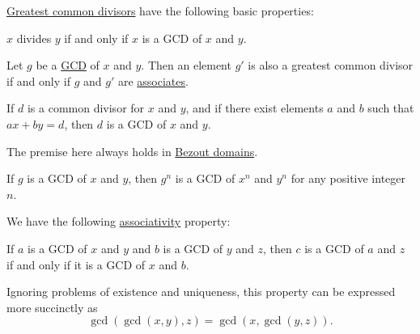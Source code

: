 \begin{proposition}\label{thm:def:gcd}
  \hyperref[def:gcd]{Greatest common divisors} have the following basic properties:
  \begin{thmenum}
     \( x \) divides \( y \) if and only if \( x \) is a GCD of \( x \) and \( y \).

     Let \( g \) be a \hyperref[def:gcd]{GCD} of \( x \) and \( y \). Then an element \( g' \) is also a greatest common divisor if and only if \( g \) and \( g' \) are \hyperref[def:domain_divisibility/associates]{associates}.

     If \( d \) is a common divisor for \( x \) and \( y \), and if there exist elements \( a \) and \( b \) such that \( ax + by = d \), then \( d \) is a GCD of \( x \) and \( y \).

    The premise here always holds in \hyperref[def:bezout_domain]{Bezout domains}.

     If \( g \) is a GCD of \( x \) and \( y \), then \( g^n \) is a GCD of \( x^n \) and \( y^n \) for any positive integer \( n \).

     We have the following \hyperref[def:binary_operation/associative]{associativity} property:
    \begin{displayquote}
      If \( a \) is a GCD of \( x \) and \( y \) and \( b \) is a GCD of \( y \) and \( z \), then \( c \) is a GCD of \( a \) and \( z \) if and only if it is a GCD of \( x \) and \( b \).
    \end{displayquote}

    Ignoring problems of existence and uniqueness, this property can be expressed more succinctly as
    \begin{equation}\label{eq:thm:def:gcd/associative}
      \gcd(\gcd(x, y), z) = \gcd(x, \gcd(y, z)).
    \end{equation}
  \end{thmenum}
\end{proposition}
